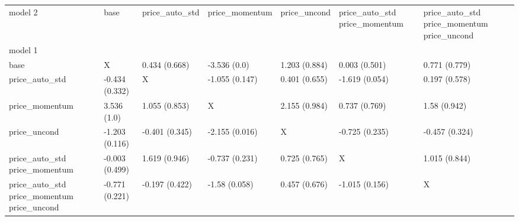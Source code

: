 \begin{tabular}{lllllll}
\toprule
model 2 & base & price_auto_std & price_momentum & price_uncond & price_auto_std price_momentum & price_auto_std price_momentum price_uncond \\
model 1 &  &  &  &  &  &  \\
\midrule
base & X & 0.434 (0.668) & \cellcolor{green} -3.536 (0.0) & 1.203 (0.884) & 0.003 (0.501) & 0.771 (0.779) \\
price_auto_std & -0.434 (0.332) & X & -1.055 (0.147) & 0.401 (0.655) & -1.619 (0.054) & 0.197 (0.578) \\
price_momentum & 3.536 (1.0) & 1.055 (0.853) & X & 2.155 (0.984) & 0.737 (0.769) & 1.58 (0.942) \\
price_uncond & -1.203 (0.116) & -0.401 (0.345) & \cellcolor{green} -2.155 (0.016) & X & -0.725 (0.235) & -0.457 (0.324) \\
price_auto_std price_momentum & -0.003 (0.499) & 1.619 (0.946) & -0.737 (0.231) & 0.725 (0.765) & X & 1.015 (0.844) \\
price_auto_std price_momentum price_uncond & -0.771 (0.221) & -0.197 (0.422) & -1.58 (0.058) & 0.457 (0.676) & -1.015 (0.156) & X \\
\bottomrule
\end{tabular}
